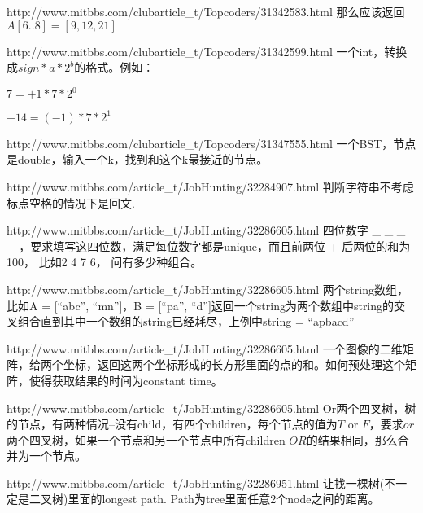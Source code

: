 \documentclass[a4paper]{article}
\begin{document}
\begin{CJK}{UTF8}{gbsn}
\begin{enumerate}
\begin{Q}[Google]{http://www.mitbbs.com/clubarticle_t/Topcoders/31342583.html}
那么应该返回$A[6..8] = [9,12,21]$
\end{Q}

\begin{Q}[Google]{http://www.mitbbs.com/clubarticle_t/Topcoders/31342599.html}
一个int，转换成$sign * a * 2 ^ b$的格式。例如： 

$7 = +1 * 7 * 2^0$

$-14 = (-1) * 7 * 2 ^ 1$
\end{Q}

\begin{Q}[Google]{http://www.mitbbs.com/clubarticle_t/Topcoders/31347555.html}
一个BST，节点是double，输入一个k，找到和这个k最接近的节点。
\end{Q}

\begin{Q}[Facebook]{http://www.mitbbs.com/article_t/JobHunting/32284907.html}
判断字符串不考虑标点空格的情况下是回文.
\end{Q}

\begin{Q}[Google]{http://www.mitbbs.com/article_t/JobHunting/32286605.html}
四位数字 \_ \_ \_ \_ ，要求填写这四位数，满足每位数字都是unique，而且前两位 + 后两位的和为100， 比如2 4 7 6， 问有多少种组合。 
\end{Q}

\begin{Q}[Google]{http://www.mitbbs.com/article_t/JobHunting/32286605.html}
两个string数组，比如A = [``abc'', ``mn'']，B = [``pa'', ``d'']返回一个string为两个数组中string的交叉组合直到其中一个数组的string已经耗尽，上例中string = ``apbacd''
\end{Q}

\begin{Q}[Google]{http://www.mitbbs.com/article_t/JobHunting/32286605.html}
一个图像的二维矩阵，给两个坐标，返回这两个坐标形成的长方形里面的点的和。如何预处理这个矩阵，使得获取结果的时间为constant time。
\end{Q}

\begin{Q}[Google]{http://www.mitbbs.com/article_t/JobHunting/32286605.html}
Or两个四叉树，树的节点，有两种情况--没有child，有四个children，每个节点的值为$T$ or $F$，要求$or$两个四叉树，如果一个节点和另一个节点中所有children $OR$的结果相同，那么合并为一个节点。
\end{Q}

\begin{Q}[Twitter]{http://www.mitbbs.com/article_t/JobHunting/32286951.html}
让找一棵树(不一定是二叉树)里面的longest path. Path为tree里面任意2个node之间的距离。
\end{Q}


\end{enumerate}
\end{CJK}
\end{document}
